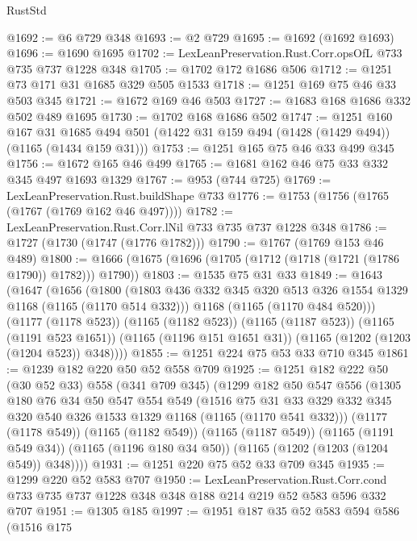 \begin{lexlean}{RustStd}
\begin{coremodule}
@1692 := @6 @729 @348
@1693 := @2 @729
@1695 := @1692 (@1692 @1693)
@1696 := @1690 @1695
@1702 := LexLeanPreservation.Rust.Corr.opsOfL @733 @735 @737 @1228 @348
@1705 := @1702 @172 @1686 @506
@1712 := @1251 @73 @171 @31 @1685 @329 @505 @1533
@1718 := @1251 @169 @75 @46 @33 @503 @345
@1721 := @1672 @169 @46 @503
@1727 := @1683 @168 @1686 @332 @502 @489 @1695
@1730 := @1702 @168 @1686 @502
@1747 := @1251
    @160
    @167
    @31
    @1685
    @494
    @501
    (@1422 @31 @159 @494 (@1428 (@1429 @494)) (@1165 (@1434 @159 @31)))
@1753 := @1251 @165 @75 @46 @33 @499 @345
@1756 := @1672 @165 @46 @499
@1765 := @1681 @162 @46 @75 @33 @332 @345 @497 @1693 @1329
@1767 := @953 (@744 @725)
@1769 := LexLeanPreservation.Rust.buildShape @733
@1776 := @1753 (@1756 (@1765 (@1767 (@1769 @162 @46 @497))))
@1782 := LexLeanPreservation.Rust.Corr.lNil @733 @735 @737 @1228 @348
@1786 := @1727 (@1730 (@1747 (@1776 @1782)))
@1790 := @1767 (@1769 @153 @46 @489)
@1800 := @1666 (@1675 (@1696 (@1705 (@1712 (@1718 (@1721 (@1786 @1790)) @1782))) @1790))
@1803 := @1535 @75 @31 @33
@1849 := @1643
    (@1647
      (@1656
        (@1800
          (@1803 @436 @332 @345 @320 @513 @326 @1554 @1329 @1168 (@1165 (@1170 @514 @332)))
          @1168
          (@1165 (@1170 @484 @520)))
        (@1177 (@1178 @523))
        (@1165 (@1182 @523))
        (@1165 (@1187 @523))
        (@1165 (@1191 @523 @1651))
        (@1165 (@1196 @151 @1651 @31))
        (@1165 (@1202 (@1203 (@1204 @523)) @348))))
@1855 := @1251 @224 @75 @53 @33 @710 @345
@1861 := @1239 @182 @220 @50 @52 @558 @709
@1925 := @1251
    @182
    @222
    @50
    (@30 @52 @33)
    @558
    (@341 @709 @345)
    (@1299
      @182
      @50
      @547
      @556
      (@1305
        @180
        @76
        @34
        @50
        @547
        @554
        @549
        (@1516
          @75
          @31
          @33
          @329
          @332
          @345
          @320
          @540
          @326
          @1533
          @1329
          @1168
          (@1165 (@1170 @541 @332)))
        (@1177 (@1178 @549))
        (@1165 (@1182 @549))
        (@1165 (@1187 @549))
        (@1165 (@1191 @549 @34))
        (@1165 (@1196 @180 @34 @50))
        (@1165 (@1202 (@1203 (@1204 @549)) @348))))
@1931 := @1251 @220 @75 @52 @33 @709 @345
@1935 := @1299 @220 @52 @583 @707
@1950 := LexLeanPreservation.Rust.Corr.cond
    @733
    @735
    @737
    @1228
    @348
    @348
    @188
    @214
    @219
    @52
    @583
    @596
    @332
    @707
@1951 := @1305 @185
@1997 := @1951
    @187
    @35
    @52
    @583
    @594
    @586
    (@1516
      @175

\end{coremodule}
\end{lexlean}
